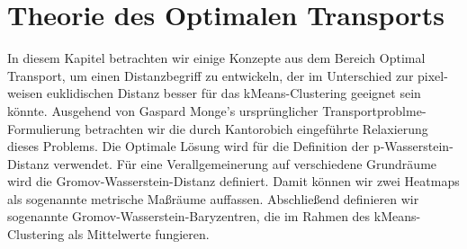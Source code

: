 \documentclass[11pt,a4paper]{article}
\numberwithin{equation}{section}
\begin{document}
	\section{Theorie des Optimalen Transports}

	In diesem Kapitel betrachten wir einige Konzepte aus dem Bereich Optimal Transport, um einen Distanzbegriff zu entwickeln, der im Unterschied zur pixel-weisen euklidischen Distanz besser für das kMeans-Clustering geeignet sein könnte.
	Ausgehend von Gaspard Monge's ursprünglicher Transportproblme-Formulierung betrachten wir die durch Kantorobich eingeführte Relaxierung dieses Problems.
	Die Optimale Lösung wird für die Definition der p-Wasserstein-Distanz verwendet.
	Für eine Verallgemeinerung auf verschiedene Grundräume wird die Gromov-Wasserstein-Distanz definiert. Damit können wir zwei Heatmaps als sogenannte metrische Maßräume auffassen.
	Abschließend definieren wir sogenannte Gromov-Wasserstein-Baryzentren, die im Rahmen des kMeans-Clustering als Mittelwerte fungieren.
	
\end{document}
